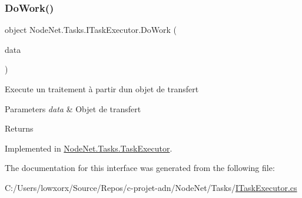 \subsubsection{\texorpdfstring{Do\+Work()}{DoWork()}}
{\footnotesize\ttfamily object Node\+Net.\+Tasks.\+I\+Task\+Executor.\+Do\+Work (\begin{DoxyParamCaption}\item[{\hyperlink{class_node_net_1_1_data_1_1_data_input}{Data\+Input}}]{data }\end{DoxyParamCaption})}



Execute un traitement à partir d\textquotesingle{}un objet de transfert 


\begin{DoxyParams}{Parameters}
{\em data} & Objet de transfert\\
\hline
\end{DoxyParams}
\begin{DoxyReturn}{Returns}

\end{DoxyReturn}


Implemented in \hyperlink{class_node_net_1_1_tasks_1_1_task_executor_ad42635f3fd256939000c4f77705d2d42}{Node\+Net.\+Tasks.\+Task\+Executor}.



The documentation for this interface was generated from the following file\+:\begin{DoxyCompactItemize}
\item 
C\+:/\+Users/lowxorx/\+Source/\+Repos/c-\/projet-\/adn/\+Node\+Net/\+Tasks/\hyperlink{_i_task_executor_8cs}{I\+Task\+Executor.\+cs}\end{DoxyCompactItemize}
